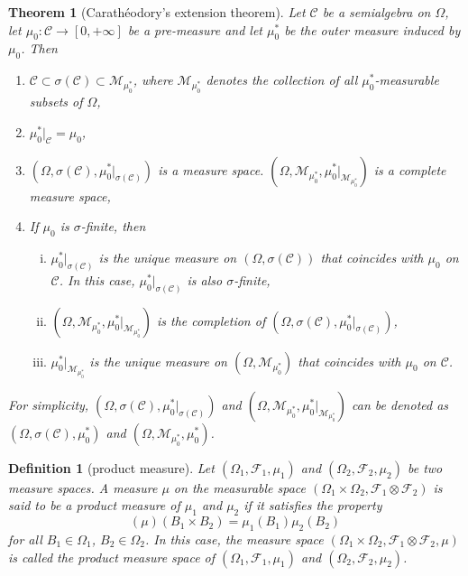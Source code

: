 \documentclass{report}
\newtheorem{definition}{Definition}[section]
\newtheorem{theorem}{Theorem}[section]
\theoremstyle{nonumberplain}
\begin{document}
\begin{theorem}[Carathéodory's extension theorem]
	Let $\mathcal{C}$ be a semialgebra on $\Omega$, let $\mu_0:\mathcal{C}\to[0,+\infty]$ be a pre-measure and let $\mu_0^*$ be the outer measure induced by $\mu_0$. Then
	\begin{enumerate}[(1)]
		\item $\mathcal{C}\subset\sigma(\mathcal{C})\subset\mathcal{M}_{\mu^{*}_0}$, where $\mathcal{M}_{\mu^{*}_0}$ denotes the collection of all $\mu^{*}_0$-measurable subsets of $\Omega$,
		\item $\mu^{*}_0|_{\mathcal{C}}=\mu_0$,
		\item $(\Omega, \sigma(\mathcal{C}), \mu_0^{*}|_{\sigma(\mathcal{C})})$ is a measure space. $(\Omega, \mathcal{M}_{\mu^{*}_0}, \mu_0^{*}|_{\mathcal{M}_{\mu^{*}_0}})$ is a complete measure space, 
		\item If $\mu_0$ is $\sigma$-finite, then
		\begin{enumerate}[(i)]
			\item $\mu^{*}_0|_{\sigma(\mathcal{C})}$ is the unique measure on $(\Omega, \sigma(\mathcal{C}))$ that coincides with $\mu_0$ on $\mathcal{C}$. In this case, $\mu^{*}_0|_{\sigma(\mathcal{C})}$ is also $\sigma$-finite,
			\item $(\Omega, \mathcal{M}_{\mu_0^{*}}, \mu_0^{*}|_{\mathcal{M}_{\mu^{*}_0}})$ is the completion of $(\Omega, \sigma(\mathcal{C}), \mu_0^{*}|_{\sigma(\mathcal{C})})$,
			\item $\mu^{*}_0|_{\mathcal{M}_{\mu^{*}_0}}$ is the unique measure on $(\Omega, \mathcal{M}_{\mu^{*}_0})$ that coincides with $\mu_0$ on $\mathcal{C}$.
		\end{enumerate}
	\end{enumerate}
	For simplicity, $(\Omega, \sigma(\mathcal{C}), \mu_0^{*}|_{\sigma(\mathcal{C})})$ and $(\Omega, \mathcal{M}_{\mu^{*}_0}, \mu_0^{*}|_{\mathcal{M}_{\mu^{*}_0}})$ can be denoted as $(\Omega, \sigma(\mathcal{C}), \mu_0^{*})$ and $(\Omega, \mathcal{M}_{\mu^{*}_0}, \mu_0^{*})$.
\end{theorem}

\begin{definition}[product measure]
	Let $(\Omega_1,\mathcal{F}_1,\mu_1)$ and $(\Omega_2,\mathcal{F}_2,\mu_2)$ be two measure spaces. 
	A measure $\mu$ on the measurable space $(\Omega_1\times\Omega_2,\mathcal{F}_1\otimes\mathcal{F}_2)$ is said to be a \emph{product measure} of $\mu_1$ and $\mu_2$ if it satisfies the property
	\[
	\left(\mu\right)\left(B_{1} \times B_{2}\right)=\mu_{1}\left(B_{1}\right) \mu_{2}\left(B_{2}\right)
	\]
	for all $B_1\in\Omega_1$, $B_2\in\Omega_2$. In this case, the measure space $(\Omega_1\times\Omega_2,\mathcal{F}_1\otimes\mathcal{F}_2,\mu)$ is called the product measure space of $(\Omega_1,\mathcal{F}_1,\mu_1)$ and $(\Omega_2,\mathcal{F}_2,\mu_2)$.
\end{definition}
\end{document}
